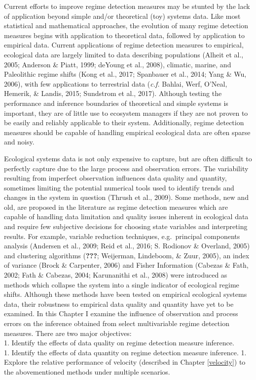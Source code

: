 \documentclass[12pt,twoside,openany]{reedthesis}
\begin{document}
Current efforts to improve regime detection measures may be stunted by the lack of application beyond simple and/or theoretical (toy) systems data. Like most statistical and mathematical approaches, the evolution of many regime detection measures begins with application to theoretical data, followed by application to empirical data. Current applications of regime detection measures to empirical, ecological data are largely limited to data describing populations (Alheit et al., 2005; Anderson \& Piatt, 1999; deYoung et al., 2008), climatic, marine, and Paleolithic regime shifts (Kong et al., 2017; Spanbauer et al., 2014; Yang \& Wu, 2006), with few applications to terrestrial data (\emph{c.f.} Bahlai, Werf, O'Neal, Hemerik, \& Landis, 2015; Sundstrom et al., 2017). Although testing the performance and inference boundaries of theoretical and simple systems is important, they are of little use to ecosystem managers if they are not proven to be easily and reliably applicable to their system. Additionally, regime detection measures should be capable of handling empirical ecological data are often sparse and noisy.

Ecological systems data is not only expensive to capture, but are often difficult to perfectly capture due to the large process and observation errors. The variability resulting from imperfect observation influences data quality and quantity, sometimes limiting the potential numerical tools used to identify trends and changes in the system in question (Thrush et al., 2009). Some methods, new and old, are proposed in the literature as regime detection measures which are capable of handling data limitation and quality issues inherent in ecological data and require few subjective decisions for choosing state variables and interpreting results. For example, variable reduction techniques, e.g.~principal components analysis (Andersen et al., 2009; Reid et al., 2016; S. Rodionov \& Overland, 2005) and clustering algorithms ({\textbf{???}}; Weijerman, Lindeboom, \& Zuur, 2005), an index of variance (Brock \& Carpenter, 2006) and Fisher Information (Cabezas \& Fath, 2002; Fath \& Cabezas, 2004; Karunanithi et al., 2008) were introduced as methods which collapse the system into a single indicator of ecological regime shifts. Although these methods have been tested on empirical ecological systems data, their robustness to empirical data quality and quantity have yet to be examined.
In this Chapter I examine the influence of observation and process errors on the inference obtained from select multivariable regime detection measures. There are two major objectives:\\
1. Identify the effects of data quality on regime detection measure inference.\\
1. Identify the effects of data quantity on regime detection measure inference.
1. Explore the relative performance of velocity (described in Chapter \ref{velocity}) to the abovementioned methods under multiple scenarios.
\end{document}

